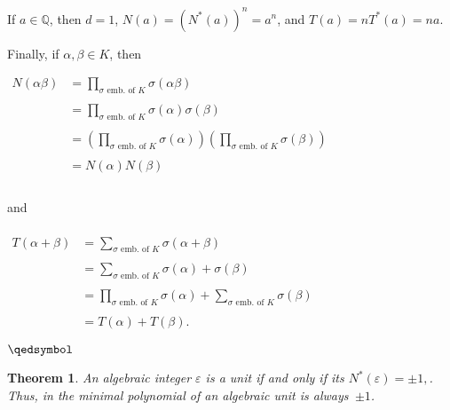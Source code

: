\documentclass[12pt]{article}
\newtheorem{thm}{Theorem}
\begin{document}
If $a \in \mathbb{Q}$, then $d=1$, $N(a)=(N^*(a))^n=a^n$, and $T(a)=nT^*(a)=na$.

Finally, if $\alpha, \beta \in K$, then

\begin{center}
$\begin{array}{ll}
\displaystyle N(\alpha \beta) & \displaystyle =\prod_{\sigma \text{ emb. of }K} \sigma(\alpha \beta) \\
\\
& \displaystyle =\prod_{\sigma \text{ emb. of }K} \sigma(\alpha) \sigma(\beta) \\
\\
& \displaystyle =\left( \prod_{\sigma \text{ emb. of }K} \sigma(\alpha) \right) \left( \prod_{\sigma \text{ emb. of }K} \sigma(\beta) \right) \\
\\
& \displaystyle =N(\alpha)N(\beta) \\
\\
\end{array}$
\end{center}

and

\begin{center}
$\begin{array}{ll}
\\
\displaystyle T(\alpha + \beta) & \displaystyle =\sum_{\sigma \text{ emb. of }K} \sigma(\alpha + \beta) \\
\\
& \displaystyle =\sum_{\sigma \text{ emb. of }K} \sigma(\alpha)+\sigma(\beta) \\
\\
& \displaystyle =\prod_{\sigma \text{ emb. of }K} \sigma(\alpha)+\sum_{\sigma \text{ emb. of }K} \sigma(\beta) \\
\\
& \displaystyle =T(\alpha)+T(\beta). \end{array}$
\end{center}

$\qedsymbol$

\begin{thm}
An algebraic integer $\varepsilon$ is a unit if and only if its  $N^*(\varepsilon)=\pm 1,$. \, Thus,  in the minimal polynomial of an algebraic unit is always \,$\pm 1$.
\end{thm}
\end{document}
